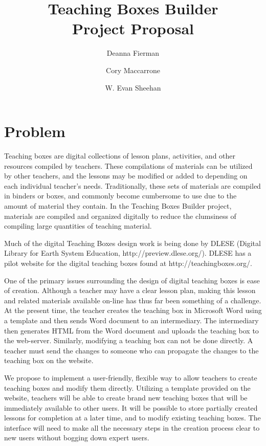 \documentclass[11pt,letter]{article}
\title{Teaching Boxes Builder\\Project Proposal}
\author{Deanna Fierman \and Cory Maccarrone \and W. Evan Sheehan}
\begin{document}
\begin{titlepage}
	\maketitle
	\thispagestyle{empty}
\end{titlepage}

\hfill
\thispagestyle{empty}
\pagebreak
\setcounter{page}{0}

\section{Problem}

Teaching boxes are digital collections of lesson plans, activities, and other
resources compiled by teachers. These compilations of materials can be utilized
by other teachers, and the lessons may be modified or added to depending on each
individual teacher's needs. Traditionally, these sets of materials are compiled
in binders or boxes, and commonly become cumbersome to use due to the amount of
material they contain.  In the Teaching Boxes Builder project, materials are
compiled and organized digitally to reduce the clumsiness of compiling large
quantities of teaching material.

Much of the digital Teaching Boxes design work is being done by DLESE (Digital
Library for Earth System Education, http://preview.dlese.org/). DLESE has a
pilot website for the digital teaching boxes found at http://teachingboxes.org/.

One of the primary issues surrounding the design of digital teaching boxes is
ease of creation.  Although a teacher may have a clear lesson plan, making this
lesson and related materials available on-line has thus far been something of a
challenge.  At the present time, the teacher creates the teaching box in
Microsoft Word using a template and then sends Word document to an intermediary.
The intermediary then generates HTML from the Word document and uploads the
teaching box to the web-server. Similarly, modifying a teaching box can not be
done directly. A teacher must send the changes to someone who can propagate the
changes to the teaching box on the website.

We propose to implement a user-friendly, flexible way to allow teachers to
create teaching boxes and modify them directly. Utilizing a template provided on
the website, teachers will be able to create brand new teaching boxes that will
be immediately available to other users. It will be possible to store partially
created lessons for completion at a later time, and to modify existing teaching
boxes. The interface will need to make all the necessary steps in the creation
process clear to new users without bogging down expert users.
\end{document}
